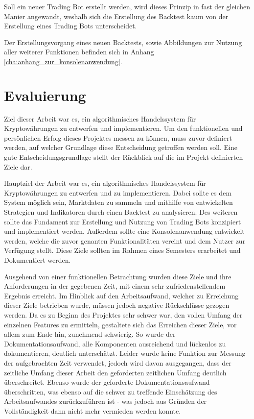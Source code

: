 \documentclass[oneside]{ausarbeitung}
\begin{document}
Soll ein neuer Trading Bot erstellt werden, wird dieses Prinzip in fast der gleichen Manier angewandt, weshalb sich die Erstellung des Backtest kaum von der Erstellung eines Trading Bots unterscheidet. 

Der Erstellungsvorgang eines neuen Backtests, sowie Abbildungen zur Nutzung aller weiterer Funktionen befinden sich in Anhang \ref{cha:anhang_zur_konsolenanwendung}.

\chapter{Evaluierung}

Ziel dieser Arbeit war es, ein algorithmisches Handelssystem für Kryptowährungen zu entwerfen und implementieren. Um den funktionellen und persönlichen Erfolg dieses Projektes messen zu können, muss zuvor definiert werden, auf welcher Grundlage diese Entscheidung getroffen werden soll. Eine gute Entscheidungsgrundlage stellt der Rückblick auf die im Projekt definierten Ziele dar.

Hauptziel der Arbeit war es, ein algorithmisches Handelssystem für Kryptowährungen zu entwerfen und zu implementieren. Dabei sollte es dem System möglich sein, Marktdaten zu sammeln und mithilfe von entwickelten Strategien und Indikatoren durch einen Backtest zu analysieren. Des weiteren sollte das Fundament zur Erstellung und Nutzung von Trading Bots konzipiert und implementiert werden. Außerdem sollte eine Konsolenanwendung entwickelt werden, welche die zuvor genanten Funktionalitäten vereint und dem Nutzer zur Verfügung stellt. Diese Ziele sollten im Rahmen eines Semesters erarbeitet und Dokumentiert werden.

Ausgehend von einer funktionellen Betrachtung wurden diese Ziele und ihre Anforderungen in der gegebenen Zeit, mit einem sehr zufriedenstellendem Ergebnis erreicht. Im Hinblick auf den Arbeitsaufwand, welcher zu Erreichung dieser Ziele betrieben wurde, müssen jedoch negative Rückschlüsse gezogen werden. Da es zu Beginn des Projektes sehr schwer war, den vollen Umfang der einzelnen Features zu ermitteln, gestaltete sich das Erreichen dieser Ziele, vor allem zum Ende hin, zunehmend schwierig. So wurde der Dokumentationsaufwand, alle Komponenten ausreichend und lückenlos zu dokumentieren, deutlich unterschätzt. Leider wurde keine Funktion zur Messung der aufgebrachten Zeit verwendet, jedoch wird davon ausgegangen, dass der zeitliche Umfang dieser Arbeit den geforderten zeitlichen Umfang deutlich überschreitet. Ebenso wurde der geforderte Dokumentationsaufwand überschritten, was ebenso auf die schwer zu treffende Einschätzung des Arbeitsaufwandes zurückzuführen ist - was jedoch aus Gründen der Vollständigkeit dann nicht mehr vermieden werden konnte.
\end{document}
